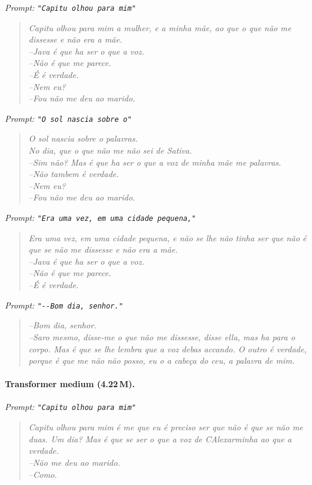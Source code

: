 \documentclass[11pt]{article}
\begin{document}
\noindent\emph{Prompt: \texttt{"Capitu olhou para mim"}}
\begin{quote}\small\itshape
Capitu olhou para mim a mulher, e a minha mãe, ao que o que não me
dissesse e não era a mãe.\\
--Java é que ha ser o que a voz.\\
--Não é que me parece.\\
--É é verdade.\\
--Nem eu?\\
--Fou não me deu ao marido.
\end{quote}

\noindent\emph{Prompt: \texttt{"O sol nascia sobre o"}}
\begin{quote}\small\itshape
O sol nascia sobre o palavras.\\
No dia, que o que não me não sei de Sativa.\\
--Sim não? Mas é que ha ser o que a voz de minha mãe me palavras.\\
--Não tambem é verdade.\\
--Nem eu?\\
--Fou não me deu ao marido.
\end{quote}

\noindent\emph{Prompt: \texttt{"Era uma vez, em uma cidade pequena,"}}
\begin{quote}\small\itshape
Era uma vez, em uma cidade pequena, e não se lhe não tinha ser que não
é que se não me dissesse e não era a mãe.\\
--Java é que ha ser o que a voz.\\
--Não é que me parece.\\
--É é verdade.
\end{quote}

\noindent\emph{Prompt: \texttt{"-{}-Bom dia, senhor."}}
\begin{quote}\small\itshape
--Bom dia, senhor.\\
--Saro mesmo, disse-me o que não me dissesse, disse ella, mas ha para
o corpo. Mas é que se lhe lembra que a voz debas accando. O outro é
verdade, porque é que me não não posso, eu o a cabeça do ceu, a
palavra de mim.
\end{quote}

\paragraph{Transformer medium (4.22\,M).}

\noindent\emph{Prompt: \texttt{"Capitu olhou para mim"}}
\begin{quote}\small\itshape
Capitu olhou para mim é me que eu é preciso ser que não é que se não me
duas. Um dia? Mas é que se ser o que a voz de CAlexarminha ao que a
verdade.\\
--Não me deu ao marido.\\
--Como.
\end{quote}
\end{document}
